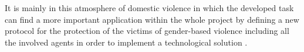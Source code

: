 	It is mainly in this atmosphere of domestic violence in which the developed task can find a more important application within the whole project by defining a new protocol for the protection of the victims of gender-based violence including all the involved agents in order to implement a technological solution \cite{UC3M4SafetyTeam2018}.
	
	
	
	
	